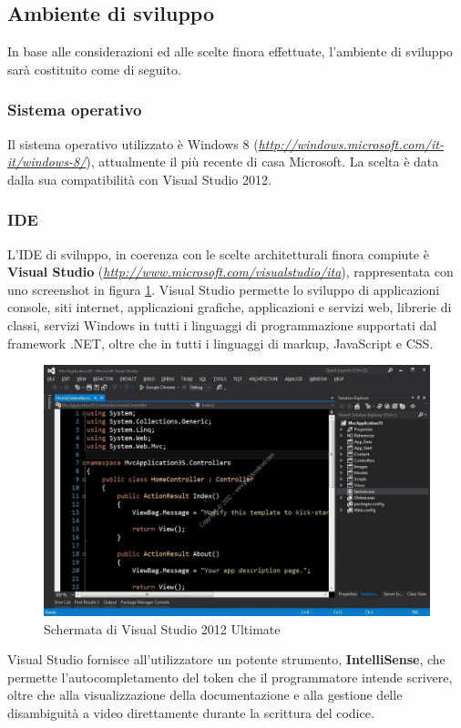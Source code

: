 \subsection{Ambiente di sviluppo}
In base alle considerazioni ed alle scelte finora effettuate, l'ambiente di sviluppo sarà costituito come di seguito.

\subsubsection{Sistema operativo}
Il sistema operativo utilizzato è Windows 8 (\emph{\url{http://windows.microsoft.com/it-it/windows-8/}}), attualmente il più recente di casa Microsoft.
La scelta è data dalla sua compatibilità con Visual Studio 2012.

\subsubsection{IDE}
L'IDE di sviluppo, in coerenza con le scelte architetturali finora compiute è \textbf{Visual Studio} (\emph{\url{http://www.microsoft.com/visualstudio/ita}}), rappresentata con uno screenshot in figura \ref{vsimage}.
Visual Studio permette lo sviluppo di applicazioni console, siti internet, applicazioni grafiche, applicazioni e servizi web, librerie di classi, servizi Windows in tutti i linguaggi di programmazione supportati dal framework .NET, oltre che in tutti i linguaggi di markup, JavaScript e CSS.

\begin{figure}
\includegraphics[scale=0.3]{imgs/visualstudio.jpg} 
\caption{Schermata di Visual Studio 2012 Ultimate\label{vsimage}}
\end{figure}
Visual Studio fornisce all’utilizzatore un potente strumento, \textbf{IntelliSense}, che permette
l'autocompletamento del token che il programmatore intende scrivere, oltre che
alla visualizzazione della documentazione e alla gestione delle disambiguità a
video direttamente durante la scrittura del codice.

